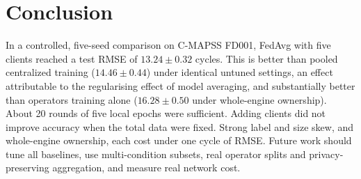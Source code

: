 \section{Conclusion}\label{sec:conclusion}

In a controlled, five-seed comparison on C-MAPSS FD001, FedAvg with five clients
reached a test RMSE of $13.24\pm0.32$ cycles. This is better than pooled
centralized training ($14.46\pm0.44$) under identical untuned settings, an effect
attributable to the regularising effect of model averaging, and substantially
better than operators training alone ($16.28\pm0.50$ under whole-engine
ownership). About 20 rounds of five local epochs were sufficient. Adding clients
did not improve accuracy when the total data were fixed. Strong label and size
skew, and whole-engine ownership, each cost under one cycle of RMSE. Future work
should tune all baselines, use multi-condition subsets, real operator splits and
privacy-preserving aggregation, and measure real network cost.
